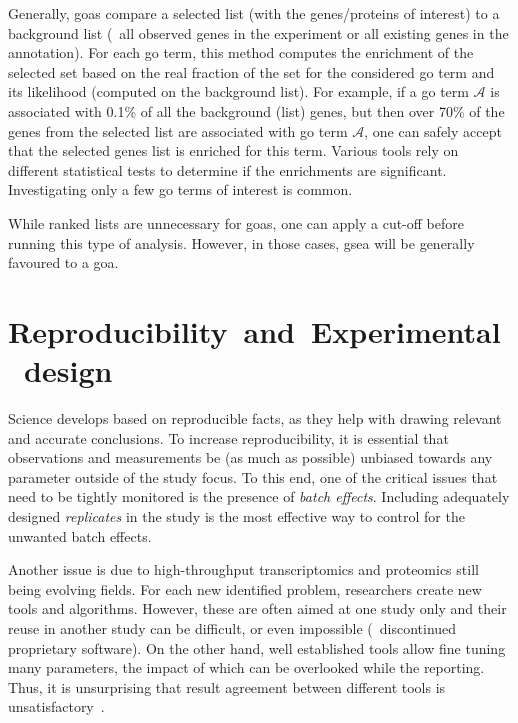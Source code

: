 Generally, \glspl{goa} compare a selected list (with the genes/proteins of interest)
to a background list
(\eg\ all observed genes in the experiment or all existing genes in the annotation).
For each \gls{go} term,
this method computes the enrichment of the selected set based on
the real fraction of the set for the considered \gls{go} term and its likelihood
(computed on the background list).
For example, if a \gls{go} term $\mathcal{A}$ is associated with 0.1\%
of all the background (list) genes,
but then over 70\% of the genes from the selected list are associated
with \gls{go} term $\mathcal{A}$,
one can safely accept that the selected genes list is enriched for this term.
Various tools rely on different statistical tests to determine
if the enrichments are significant.
Investigating only a few \gls{go} terms of interest is common.\mybr\

While ranked lists are unnecessary for \glspl{goa},
one can apply a cut-off before running this type of analysis.
However, in those cases,
\gls{gsea} will be generally favoured to a \gls{goa}.\mybr\

\section{Reproducibility~and~Experimental~design}\label{sec:expDesign}

Science develops based on reproducible facts,
as they help with drawing relevant and accurate conclusions.
To increase reproducibility,
it is essential that observations and measurements
be (as much as possible) unbiased
towards any parameter outside of the study focus.
To this end, one of the critical issues that need to be tightly monitored
is the presence of \emph{batch effects}.
Including adequately designed \emph{replicates} in the study
is the most effective way to control for the unwanted batch effects.\mybr\

Another issue is due to high-throughput transcriptomics and proteomics
still being evolving fields.
For each new identified problem,
researchers create new tools and algorithms.
However, these are often aimed at one study only
and their reuse in another study can be difficult,
or even impossible (\eg\ discontinued proprietary software).
On the other hand, well established tools allow fine tuning many parameters,
the impact of which can be overlooked while the reporting.
Thus, it is unsurprising that result agreement between different tools
is unsatisfactory~.\mybr\

